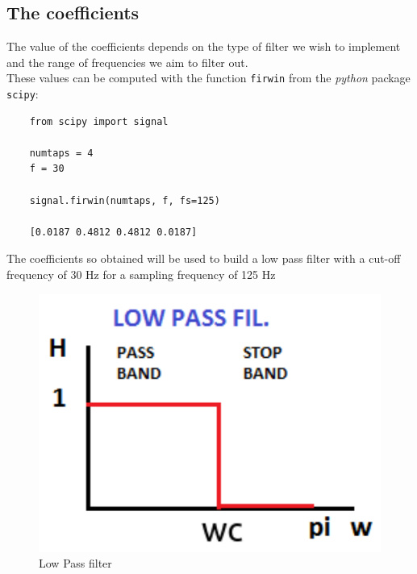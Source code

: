\documentclass[11pt,a4paper,twocolumn]{IEEEtran}
\begin{document}
	\subsection*{The coefficients}
	The value of the coefficients depends on the type of filter we wish to implement and the range of frequencies we aim to filter out.\\
	These values can be computed with the function \texttt{firwin} from the \emph{python} package \texttt{scipy}:
	\begin{lstlisting}
	from scipy import signal
	
	numtaps = 4
	f = 30
	
	signal.firwin(numtaps, f, fs=125)
	
	[0.0187 0.4812 0.4812 0.0187]
	\end{lstlisting}
	The coefficients so obtained will be used to build a low pass filter with a cut-off frequency of 30 Hz for a sampling frequency of 125 Hz
	\begin{figure}[h]
		\centering
		\includegraphics[width=0.7\linewidth]{img/lowpass}
		\caption{Low Pass filter}
	\end{figure}
\end{document}
